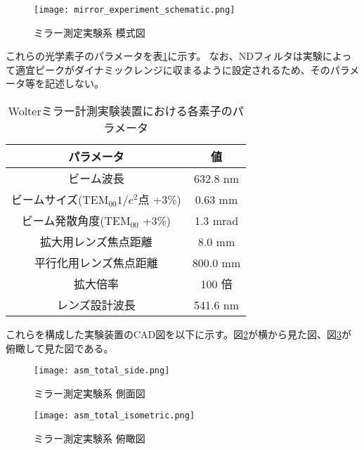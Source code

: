 \begin{figure}[!ht]
\centering
\texttt{[image: mirror\_experiment\_schematic.png]}
\caption{ミラー測定実験系 模式図}
\label{fig:mirror_experiment_schematic}
\end{figure}

これらの光学素子のパラメータを表\ref{tb:mirror_experiment_params}に示す。
なお、NDフィルタは実験によって適宜ピークがダイナミックレンジに収まるように設定されるため、そのパラメータ等を記述しない。

\begin{table}[h]
\begin{center}
  \begin{tabular}{|c|c|} \hline
    パラメータ & 値 \\ \hline
    ビーム波長 & 632.8 nm  \\
    ビームサイズ($\text{TEM}_{00} 1/e^2$点 +3\%) & 0.63 mm  \\
    ビーム発散角度($\text{TEM}_{00}$ +3\%) & 1.3 mrad  \\
    拡大用レンズ焦点距離 & 8.0 mm  \\
    平行化用レンズ焦点距離 & 800.0 mm  \\
    拡大倍率 & 100 倍 \\
    レンズ設計波長 & 541.6 nm \\ \hline
  \end{tabular}
  \caption{Wolterミラー計測実験装置における各素子のパラメータ}
  \label{tb:mirror_experiment_params}
\end{center}
\end{table}

これらを構成した実験装置のCAD図を以下に示す。図\ref{fig:mirror_experiment_asm_cad_side}が横から見た図、図\ref{fig:mirror_experiment_asm_cad_isometric}が俯瞰して見た図である。

\begin{figure}[!ht]
\centering
\texttt{[image: asm\_total\_side.png]}
\caption{ミラー測定実験系 側面図}
\label{fig:mirror_experiment_asm_cad_side}
\end{figure}

\begin{figure}[!ht]
\centering
\texttt{[image: asm\_total\_isometric.png]}
\caption{ミラー測定実験系 俯瞰図}
\label{fig:mirror_experiment_asm_cad_isometric}
\end{figure}


